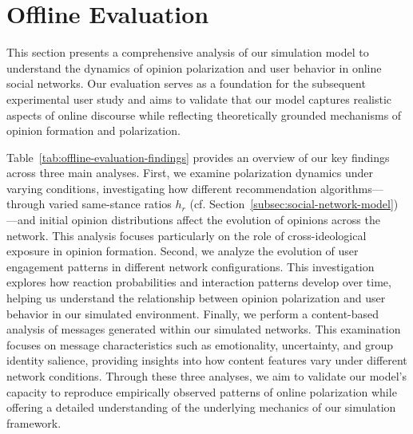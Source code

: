 \section{Offline Evaluation}
\label{sec:offline-evaluation}

This section presents a comprehensive analysis of our simulation model to understand the dynamics of opinion polarization and user behavior in online social networks. Our evaluation serves as a foundation for the subsequent experimental user study and aims to validate that our model captures realistic aspects of online discourse while reflecting theoretically grounded mechanisms of opinion formation and polarization.

Table~\ref{tab:offline-evaluation-findings} provides an overview of our key findings across three main analyses. First, we examine polarization dynamics under varying conditions, investigating how different recommendation algorithms---through varied same-stance ratios $h_r$ (cf. Section~\ref{subsec:social-network-model})---and initial opinion distributions affect the evolution of opinions across the network. This analysis focuses particularly on the role of cross-ideological exposure in opinion formation. Second, we analyze the evolution of user engagement patterns in different network configurations. This investigation explores how reaction probabilities and interaction patterns develop over time, helping us understand the relationship between opinion polarization and user behavior in our simulated environment. Finally, we perform a content-based analysis of messages generated within our simulated networks. This examination focuses on message characteristics such as emotionality, uncertainty, and group identity salience, providing insights into how content features vary under different network conditions. Through these three analyses, we aim to validate our model's capacity to reproduce empirically observed patterns of online polarization while offering a detailed understanding of the underlying mechanics of our simulation framework.



